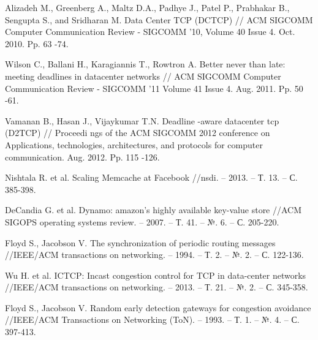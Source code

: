 \documentclass[14pt, a4paper,oneside]{extarticle}
\begin{document}
\begin{thebibliography}{9}

Alizadeh M., Greenberg A., Maltz
 D.A., Padhye J., Patel P., Prabhakar B., 
Sengupta S., and Sridharan M. Data Center TCP (DCTCP) // ACM SIGCOMM 
Computer Communication Review -
 SIGCOMM '10, Volume 40 Issue 4. Oct. 
2010. Pp. 63
-74.

Wilson C., Ballani H., Karagiannis T., Rowtron
 A. Better never than late: meeting 
deadlines in datacenter networks // ACM SIGCOMM Computer Communication 
Review 
- SIGCOMM '11 Volume 41 Issue 4. Aug. 2011. Pp. 50
-61. 

Vamanan B., Hasan J., Vijaykumar T.N. Deadline
-aware datacenter tcp (D2TCP) 
// Proceedi
ngs of the ACM SIGCOMM 2012 conference on Applications, 
technologies, architectures, and protocols for computer communication. Aug. 
2012. Pp. 115
-126. 

Nishtala R. et al. Scaling Memcache at Facebook //nsdi. – 2013. – Т. 13. – С. 385-398.

DeCandia G. et al. Dynamo: amazon's highly available key-value store //ACM SIGOPS operating systems review. – 2007. – Т. 41. – №. 6. – С. 205-220.

Floyd S., Jacobson V. The synchronization of periodic routing messages //IEEE/ACM transactions on networking. – 1994. – Т. 2. – №. 2. – С. 122-136.

Wu H. et al. ICTCP: Incast congestion control for TCP in data-center networks //IEEE/ACM transactions on networking. – 2013. – Т. 21. – №. 2. – С. 345-358.

Floyd S., Jacobson V. Random early detection gateways for congestion avoidance //IEEE/ACM Transactions on Networking (ToN). – 1993. – Т. 1. – №. 4. – С. 397-413.

\end{thebibliography}
\end{document}
